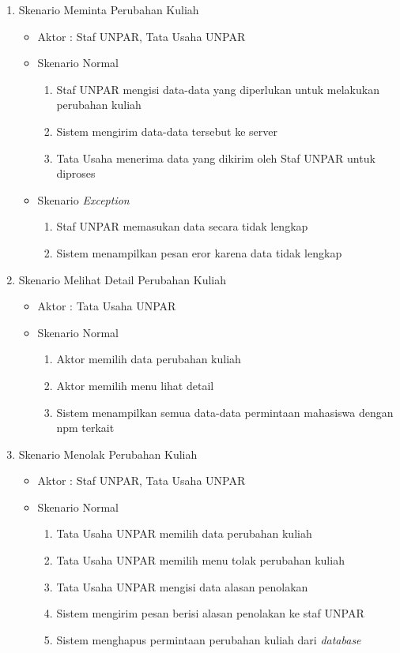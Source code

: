 \begin{enumerate}
	\item Skenario Meminta Perubahan Kuliah
	\begin{itemize}
		\item Aktor : Staf UNPAR, Tata Usaha UNPAR
		\item Skenario Normal
			\begin{enumerate}[1.]
				\item Staf UNPAR mengisi data-data yang diperlukan untuk melakukan perubahan kuliah
				\item Sistem mengirim data-data tersebut ke server 
				\item Tata Usaha menerima data yang dikirim oleh Staf UNPAR untuk diproses
			\end{enumerate}
		\item Skenario \textit{Exception}
			\begin{enumerate}[1.]
			 	\item Staf UNPAR memasukan data secara tidak lengkap
			 	\item Sistem menampilkan pesan eror karena data tidak lengkap
			\end{enumerate}
	\end{itemize}


	\item Skenario Melihat Detail Perubahan Kuliah
	\begin{itemize}
		\item Aktor : Tata Usaha UNPAR
		\item Skenario Normal
			\begin{enumerate}[1.]
				\item Aktor memilih data perubahan kuliah 
				\item Aktor memilih menu lihat detail
				\item Sistem menampilkan semua data-data permintaan mahasiswa dengan npm terkait 
			\end{enumerate}
	\end{itemize}
	
	\item Skenario Menolak Perubahan Kuliah 
	\begin{itemize}
		\item Aktor : Staf UNPAR, Tata Usaha UNPAR
		\item Skenario Normal
			\begin{enumerate}[1.]
				\item Tata Usaha UNPAR memilih data perubahan kuliah 
				\item Tata Usaha UNPAR memilih menu tolak perubahan kuliah
				\item Tata Usaha UNPAR mengisi data alasan penolakan
				\item Sistem mengirim pesan berisi alasan penolakan ke staf UNPAR
				\item Sistem menghapus permintaan perubahan kuliah dari \textit{database}
			\end{enumerate}
	\end{itemize}
	

\end{enumerate}
